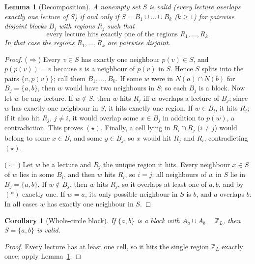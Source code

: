 \documentclass[11pt,a4paper]{article}
\newtheorem{lemma}{Lemma}
\newtheorem{corollary}{Corollary}
\theoremstyle{definition}
\theoremstyle{remark}
\newcommand{\Z}{\mathbb{Z}}
\begin{document}
\begin{lemma}[Decomposition]\label{lem:decomp}
A nonempty set $S$ is valid (every lecture overlaps exactly one lecture of $S$) if and
only if $S=B_1\cup\dots\cup B_k$ ($k\ge1$) for pairwise disjoint blocks $B_j$ with
regions $R_j$ such that
\begin{equation}\tag{$\star$}
\text{every lecture hits exactly one of the regions } R_1,\dots,R_k .
\end{equation}
In that case the regions $R_1,\dots,R_k$ are pairwise disjoint.
\end{lemma}
\begin{proof}
($\Rightarrow$) Every $v\in S$ has exactly one neighbour $p(v)\in S$, and
$p(p(v))=v$ because $v$ is a neighbour of $p(v)$ in $S$.  Hence $S$ splits into the pairs
$\{v,p(v)\}$; call them $B_1,\dots,B_k$.  If some $w$ were in $N(a)\cap N(b)$ for
$B_j=\{a,b\}$, then $w$ would have two neighbours in $S$; so each $B_j$ is a block.
Now let $w$ be any lecture.  If $w\notin S$, then $w$ hits $R_j$ iff $w$ overlaps a
lecture of $B_j$; since $w$ has exactly one neighbour in $S$, it hits exactly one
region.  If $w\in B_i$, it hits $R_i$; if it also hit $R_j$, $j\ne i$, it would overlap
some $x\in B_j$ in addition to $p(w)$, a contradiction.  This proves $(\star)$.
Finally, a cell lying in $R_i\cap R_j$ ($i\ne j$) would belong to some $x\in B_i$ and
some $y\in B_j$, so $x$ would hit $R_j$ and $R_i$, contradicting $(\star)$.

($\Leftarrow$) Let $w$ be a lecture and $R_j$ the unique region it hits.  Every
neighbour $x\in S$ of $w$ lies in some $B_i$, and then $w$ hits $R_i$, so $i=j$:
all neighbours of $w$ in $S$ lie in $B_j=\{a,b\}$.  If $w\notin B_j$, then $w$ hits
$R_j$, so it overlaps at least one of $a,b$, and by $(\ast)$ exactly one.  If $w=a$, its
only possible neighbour in $S$ is $b$, and $a$ overlaps $b$.  In all cases $w$ has
exactly one neighbour in $S$.
\end{proof}

\begin{corollary}[Whole-circle block]\label{cor:whole}
If $\{a,b\}$ is a block with $A_a\cup A_b=\Z_L$, then $S=\{a,b\}$ is valid.
\end{corollary}
\begin{proof}
Every lecture has at least one cell, so it hits the single region $\Z_L$ exactly once;
apply Lemma~\ref{lem:decomp}.
\end{proof}
\end{document}

